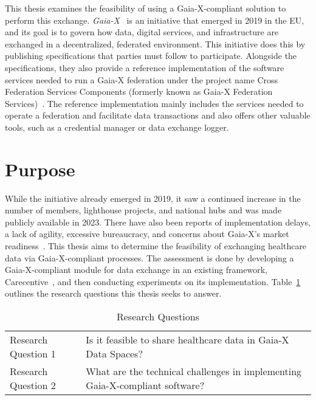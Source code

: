 This thesis examines the feasibility of using a Gaia-X-compliant solution to perform this exchange.
\textit{Gaia-X}~\cite{gaiax} is an initiative that emerged in 2019 in the EU, and its goal is to govern how data, digital services, and infrastructure are exchanged in a decentralized, federated environment.
This initiative does this by publishing specifications that parties must follow to participate.
Alongside the specifications, they also provide a reference implementation of the software services needed to run a Gaia-X federation under the project name Cross Federation Services Components (formerly known as Gaia-X Federation Services)~\cite{gxfs}.
The reference implementation mainly includes the services needed to operate a federation and facilitate data transactions and also offers other valuable tools, such as a credential manager or data exchange logger.

\section{Purpose}\label{sec:purpose}

While the initiative already emerged in 2019, it saw a continued increase in the number of members, lighthouse projects, and national hubs and was made publicly available in 2023.
There have also been reports of implementation delays, a lack of agility, excessive bureaucracy, and concerns about Gaia-X's market readiness~\cite{say_gaia-x_2024, noauthor_inside_2021, eichberger_why_2021}.
This thesis aims to determine the feasibility of exchanging healthcare data via Gaia-X-compliant processes.
The assessment is done by developing a Gaia-X-compliant module for data exchange in an existing framework, Carecentive~\cite{carecentive}, and then conducting experiments on its implementation.
Table~\ref{tab:research-questions} outlines the research questions this thesis seeks to answer.

\begin{table}
    \centering
    {\renewcommand{\arraystretch}{1.7}
        \begin{tabular}{ p{4cm}|p{11cm} }
            Research Question 1 & Is it feasible to share healthcare data in Gaia-X Data Spaces?\\
            \hhline{--}
            Research Question 2 & What are the technical challenges in implementing Gaia-X-compliant software?
        \end{tabular}
    }
    \caption{Research Questions}
    \label{tab:research-questions}
\end{table}

